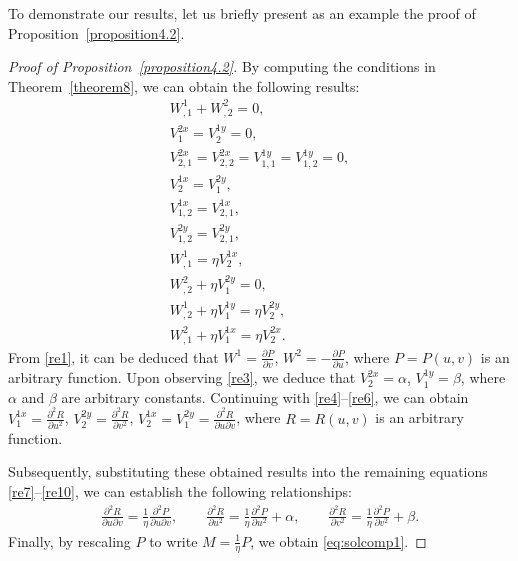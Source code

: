 \documentclass[10pt,a4paper]{amsart}
\numberwithin{equation}{section}
\begin{document}
To demonstrate our results, let us briefly present as an example the proof of Proposition~\ref{proposition4.2}.
\begin{proof}[Proof of Proposition~\ref{proposition4.2}]\allowdisplaybreaks
By computing the conditions in Theorem~\ref{theorem8}, we can obtain the following results:
\begin{subequations}
\begin{gather}
 W^1_{,1}+W^2_{,2}=0,\label{re1}\\
 V^{2x}_1=V^{1y}_2=0,\label{re2}\\
 V^{2x}_{2,1}=V^{2x}_{2,2}=V^{1y}_{1,1}=V^{1y}_{1,2}=0,\label{re3}\\
 V^{1x}_2=V^{2y}_1,\label{re4}\\
 V^{1x}_{1,2}=V^{1x}_{2,1},\label{re5}\\
 V^{2y}_{1,2}=V^{2y}_{2,1},\label{re6}\\
 W^1_{,1}=\eta V^{1x}_2,\label{re7}\\
 W^2_{,2}+\eta V^{2y}_1=0,\label{re8}\\
 W^1_{,2}+\eta V^{1y}_1=\eta V^{2y}_2,\label{re9}\\
 W^2_{,1}+\eta V^{1x}_1=\eta V^{2x}_2.\label{re10}
\end{gather}
\end{subequations}
From \eqref{re1}, it can be deduced that
$W^1=\frac{\partial P}{\partial v}$,
$W^2=-\frac{\partial P}{\partial u}$,
where $P=P(u,v)$ is an arbitrary function.
Upon observing \eqref{re3}, we deduce that
$V^{2x}_2=\alpha$,
$V^{1y}_1=\beta$,
where $\alpha$ and $\beta$ are arbitrary constants.
Continuing with \eqref{re4}--\eqref{re6}, we can obtain
$V^{1x}_1=\frac{\partial^2 R}{\partial u^2}$,
$V^{2y}_2=\frac{\partial^2 R}{\partial v^2}$,
$V^{1x}_2=V^{2y}_1=\frac{\partial^2 R}{\partial u\partial v}$,
where $R=R(u,v)$ is an arbitrary function.

Subsequently, substituting these obtained results into the remaining equations \eqref{re7}--\eqref{re10}, we can establish the following relationships:
\begin{gather*}
\frac{\partial^2 R}{\partial u\partial v}=\frac{1}{\eta}\frac{\partial^2P}{\partial u\partial v},\qquad
\frac{\partial^2 R}{\partial u^2}=\frac{1}{\eta}\frac{\partial^2P}{\partial u^2}+\alpha,\qquad
\frac{\partial^2 R}{\partial v^2}=\frac{1}{\eta}\frac{\partial^2P}{\partial v^2}+\beta.
\end{gather*}
Finally, by rescaling $P$ to write $M=\frac{1}{\eta}P$, we obtain \eqref{eq:solcomp1}.
\end{proof}
\end{document}

